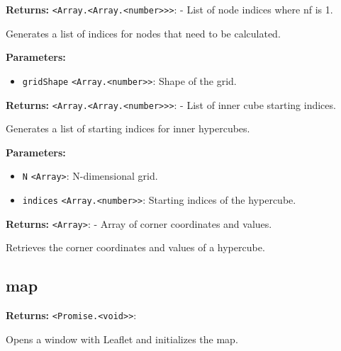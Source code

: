 \documentclass[12pt,a4paper]{article}
\begin{document}
\noindent \textbf{Returns:} \texttt{<Array.<Array.<number>>>}: - List of node indices where nf is 1.

\noindent Generates a list of indices for nodes that need to be calculated.

\vspace{5mm}
\noindent {}


\noindent \textbf{Parameters:}
\begin{itemize}
  \item \texttt{gridShape} \texttt{<Array.<number>>}: Shape of the grid.
\end{itemize}

\noindent \textbf{Returns:} \texttt{<Array.<Array.<number>>>}: - List of inner cube starting indices.

\noindent Generates a list of starting indices for inner hypercubes.

\vspace{5mm}
\noindent {}


\noindent \textbf{Parameters:}
\begin{itemize}
  \item \texttt{N} \texttt{<Array>}: N-dimensional grid.
  \item \texttt{indices} \texttt{<Array.<number>>}: Starting indices of the hypercube.
\end{itemize}

\noindent \textbf{Returns:} \texttt{<Array>}: - Array of corner coordinates and values.

\noindent Retrieves the corner coordinates and values of a hypercube.


\subsection{map}
\vspace{5mm}
\noindent {}


\noindent \textbf{Returns:} \texttt{<Promise.<void>>}: 

\noindent Opens a window with Leaflet and initializes the map.
\end{document}
